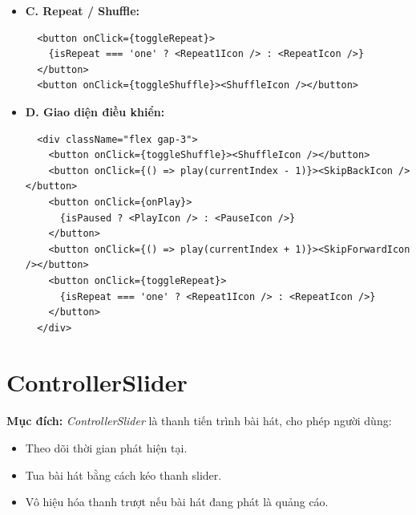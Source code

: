 \begin{enumerate}
\begin{itemize}
    \item \textbf{C. Repeat / Shuffle:}
    \begin{verbatim}
  <button onClick={toggleRepeat}>
    {isRepeat === 'one' ? <Repeat1Icon /> : <RepeatIcon />}
  </button>
  <button onClick={toggleShuffle}><ShuffleIcon /></button>
    \end{verbatim}
  
    \item \textbf{D. Giao diện điều khiển:}
    \begin{verbatim}
  <div className="flex gap-3">
    <button onClick={toggleShuffle}><ShuffleIcon /></button>
    <button onClick={() => play(currentIndex - 1)}><SkipBackIcon /></button>
    <button onClick={onPlay}>
      {isPaused ? <PlayIcon /> : <PauseIcon />}
    </button>
    <button onClick={() => play(currentIndex + 1)}><SkipForwardIcon /></button>
    <button onClick={toggleRepeat}>
      {isRepeat === 'one' ? <Repeat1Icon /> : <RepeatIcon />}
    </button>
  </div>
    \end{verbatim}
  \end{itemize}
  
\end{enumerate}


\section{ControllerSlider}

\textbf{Mục đích:} \textit{ControllerSlider} là thanh tiến trình bài hát, cho phép người dùng:
\begin{itemize}
  \item Theo dõi thời gian phát hiện tại.
  \item Tua bài hát bằng cách kéo thanh slider.
  \item Vô hiệu hóa thanh trượt nếu bài hát đang phát là quảng cáo.
\end{itemize}

